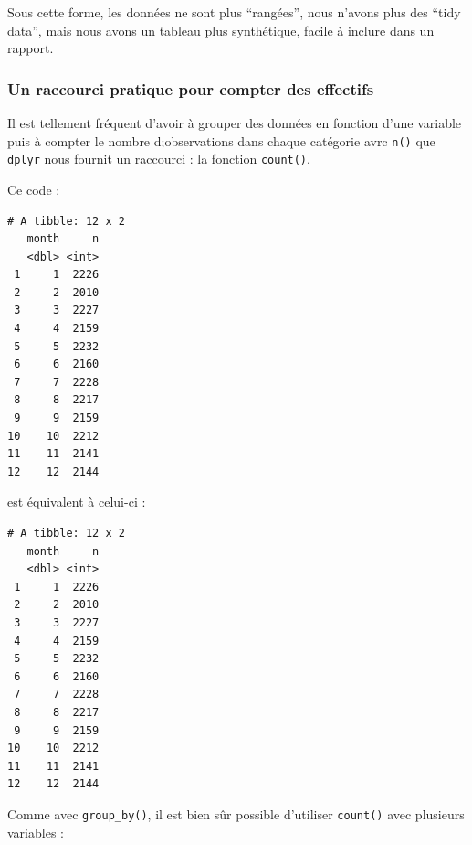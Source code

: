\documentclass[a4paperpaper,]{article}
\newenvironment{Shaded}{\begin{snugshade}}{\end{snugshade}}
\newcommand{\KeywordTok}[1]{\textcolor[rgb]{0.13,0.29,0.53}{\textbf{#1}}}
\newcommand{\DataTypeTok}[1]{\textcolor[rgb]{0.13,0.29,0.53}{#1}}
\newcommand{\StringTok}[1]{\textcolor[rgb]{0.31,0.60,0.02}{#1}}
\newcommand{\OperatorTok}[1]{\textcolor[rgb]{0.81,0.36,0.00}{\textbf{#1}}}
\newcommand{\NormalTok}[1]{#1}
\theoremstyle{definition}
\theoremstyle{definition}
\theoremstyle{definition}
\theoremstyle{remark}
\begin{document}
Sous cette forme, les données ne sont plus ``rangées'', nous n'avons
plus des ``tidy data'', mais nous avons un tableau plus synthétique,
facile à inclure dans un rapport.

\subsubsection{Un raccourci pratique pour compter des
effectifs}\label{un-raccourci-pratique-pour-compter-des-effectifs}

Il est tellement fréquent d'avoir à grouper des données en fonction
d'une variable puis à compter le nombre d;observations dans chaque
catégorie avrc \texttt{n()} que \texttt{dplyr} nous fournit un raccourci
: la fonction \texttt{count()}.

Ce code :

\begin{Shaded}
\end{Shaded}

\begin{verbatim}
# A tibble: 12 x 2
   month     n
   <dbl> <int>
 1     1  2226
 2     2  2010
 3     3  2227
 4     4  2159
 5     5  2232
 6     6  2160
 7     7  2228
 8     8  2217
 9     9  2159
10    10  2212
11    11  2141
12    12  2144
\end{verbatim}

est équivalent à celui-ci :

\begin{Shaded}
\end{Shaded}

\begin{verbatim}
# A tibble: 12 x 2
   month     n
   <dbl> <int>
 1     1  2226
 2     2  2010
 3     3  2227
 4     4  2159
 5     5  2232
 6     6  2160
 7     7  2228
 8     8  2217
 9     9  2159
10    10  2212
11    11  2141
12    12  2144
\end{verbatim}

Comme avec \texttt{group\_by()}, il est bien sûr possible d'utiliser
\texttt{count()} avec plusieurs variables :
\end{document}
